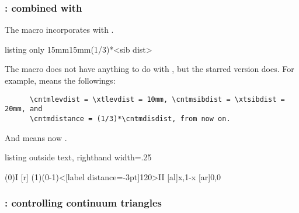 

\subsubsection{\protect\cmd{\cntmdistance*}: combined with \protect\cmd{\xtdistance}}
\label{sec:xtdistance*}

The macro \icmd{\cntmdistance*} incorporates \cmd{\cntmdistance} with \cmd{\xtdistance}.

\begin{tcblisting}{listing only}
  {15mm}{15mm}{(1/3)*<sib dist>}
\end{tcblisting}

The macro \cmd{\cntmdistance} does not have anything to do with \cmd{\xdistance}, but the starred version \cmd{\cntmdistance*} does.
For example, \cmd{\cntmdistance*\{10mm\}\{20mm\}} means the followings:
\begin{verbatim}
      \cntmlevdist = \xtlevdist = 10mm, \cntmsibdist = \xtsibdist = 20mm, and
      \cntmdistance = (1/3)*\cntmdisdist, from now on.
\end{verbatim}
And \cmd{\cntmdistance*\{10mm\}\{20mm\}\{3mm\}} means now \cmd{\cntmactsibdist\ = 3mm}.

\begin{tcblisting}{listing outside text, righthand width=.25\linewidth}
\begin{istgame}[scale=1.2]
\cntmdistance*{10mm}{20mm}{3mm}
\istrootcntm(0){I}
  [r]  \istbm  \endist
\istroot(1)(0-1)<[label distance=-3pt]120>{II}
  [al]{x,1-x}  [ar]{0,0}  \endist
\end{istgame}
\end{tcblisting}




\subsubsection{\protect\cmd{\cntmpreset}: controlling continuum triangles}
\label{ssec:cntmpreset}

